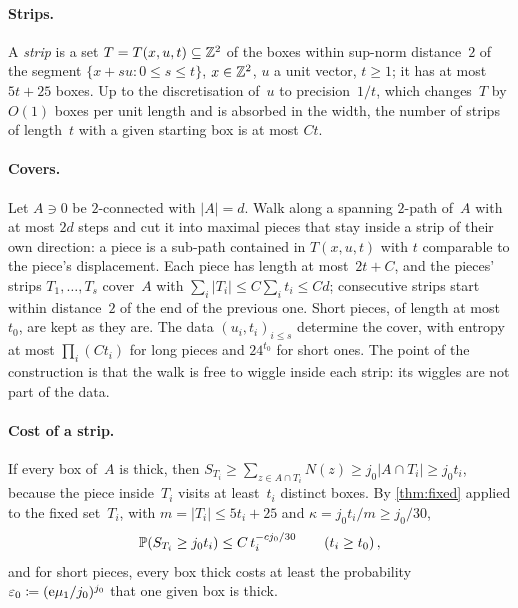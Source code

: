\documentclass[11pt,letterpaper]{article}
\begin{document}
\paragraph{Strips.} A \emph{strip} is a set $T=T(x,u,t)\subseteq\Z^2$ of the boxes within sup-norm distance~$2$ of the segment $\{x+su\colon0\le s\le t\}$, $x\in\Z^2$, $u$ a unit vector, $t\ge1$; it has at most $5t+25$ boxes. Up to the discretisation of~$u$ to precision~$1/t$, which changes~$T$ by $O(1)$ boxes per unit length and is absorbed in the width, the number of strips of length~$t$ with a given starting box is at most $Ct$.

\paragraph{Covers.} Let $A\ni0$ be $2$-connected with $\lvert A\rvert=d$. Walk along a spanning $2$-path of~$A$ with at most $2d$ steps and cut it into maximal pieces that stay inside a strip of their own direction: a piece is a sub-path contained in $T(x,u,t)$ with $t$ comparable to the piece's displacement. Each piece has length at most~$2t+C$, and the pieces' strips $T_1,\dots,T_s$ cover~$A$ with $\sum_i\lvert T_i\rvert\le C\sum_it_i\le Cd$; consecutive strips start within distance~$2$ of the end of the previous one. Short pieces, of length at most~$t_0$, are kept as they are. The data $(u_i,t_i)_{i\le s}$ determine the cover, with entropy at most $\prod_i(Ct_i)$ for long pieces and $24^{t_0}$ for short ones. The point of the construction is that the walk is free to wiggle inside each strip: its wiggles are not part of the data.

\paragraph{Cost of a strip.} If every box of~$A$ is thick, then $S_{T_i}\ge\sum_{z\in A\cap T_i}N(z)\ge j_0\lvert A\cap T_i\rvert\ge j_0t_i$, because the piece inside~$T_i$ visits at least~$t_i$ distinct boxes. By \cref{thm:fixed} applied to the fixed set~$T_i$, with $m=\lvert T_i\rvert\le5t_i+25$ and $\kappa=j_0t_i/m\ge j_0/30$,
\begin{equation}
\label{eq:stripcost}
  \P(S_{T_i}\ge j_0t_i)\le C\,t_i^{-cj_0/30}\qquad(t_i\ge t_0)\,,
\end{equation}
and for short pieces, every box thick costs at least the probability $\varepsilon_0\coloneqq(\e\mu_1/j_0)^{j_0}$ that one given box is thick.
\end{document}
